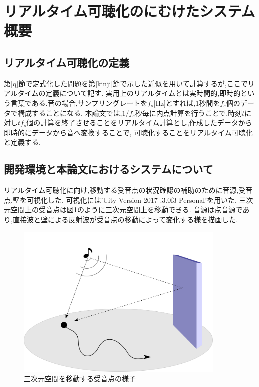 \documentclass[dvipdfmx]{ampbt}
\begin{document}
\section{リアルタイム可聴化のにむけたシステム概要}
\subsection{リアルタイム可聴化の定義}
第\ref{q}節で定式化した問題を第\ref{kinji}節で示した近似を用いて計算するが,ここでリアルタイムの定義について記す.
実用上のリアルタイムとは実時間的,即時的という言葉である.音の場合,サンプリングレートを$f_s$[Hz]とすれば,1秒間を$f_s$個のデータで構成することになる.
本論文では,$1/f_s$秒毎に内点計算を行うことで,時刻$t$に対し$tf_s$個の計算を終了させることをリアルタイム計算とし,作成したデータから即時的にデータから音へ変換することで,
可聴化することをリアルタイム可聴化と定義する.


\subsection{開発環境と本論文におけるシステムについて}
リアルタイム可聴化に向け,移動する受音点の状況確認の補助のために音源,受音点,壁を可視化した.
可視化には'Uity Version 2017 .3.0f3 Personal'を用いた.
三次元空間上の受音点は図\ref{fig:move_naiten}のように三次元空間上を移動できる.
音源は点音源であり,直接波と壁による反射波が受音点の移動によって変化する様を描画した.
\begin{figure}[H]
  \begin{center}
    \includegraphics[clip,width=10.0cm]{./png/move_naiten.png}
    \caption{三次元空間を移動する受音点の様子}
    \label{fig:move_naiten}
  \end{center}
\end{figure}\\
\end{document}

